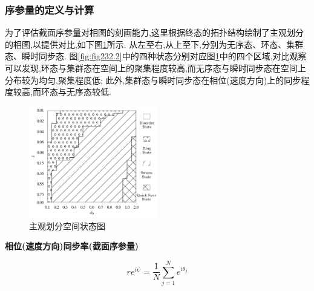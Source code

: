 \documentclass{article}
\begin{document}
\subsubsection{序参量的定义与计算}

为了评估截面序参量对相图的刻画能力,这里根据终态的拓扑结构绘制了主观划分的相图,以提供对比,如下图\ref{fig:fig234.1}所示. 从左至右,从上至下,分别为无序态、环态、集群态、瞬时同步态. 图\ref{fig:fig232.2}中的四种状态分别对应图\ref{fig:fig234.1}中的四个区域,对比观察可以发现,环态与集群态在空间上的聚集程度较高,而无序态与瞬时同步态在空间上分布较为均匀,聚集程度低; 此外,集群态与瞬时同步态在相位(速度方向)上的同步程度较高,而环态与无序态较低.

\begin{figure}[H]
	\centering
	\includegraphics[width=0.5\textwidth]{./figs/subjectiveOp3.png}
	\vspace{-0.5cm}
	\caption{主观划分空间状态图}
	\label{fig:fig234.1}
\end{figure}
\vspace{-0.5cm}

\noindent\textbf{相位(速度方向)同步率(截面序参量)}

$$
r e^{i\psi}=\frac{1}{N}\sum_{j=1}^{N}{e^{i\theta _j}}
$$
\end{document}
